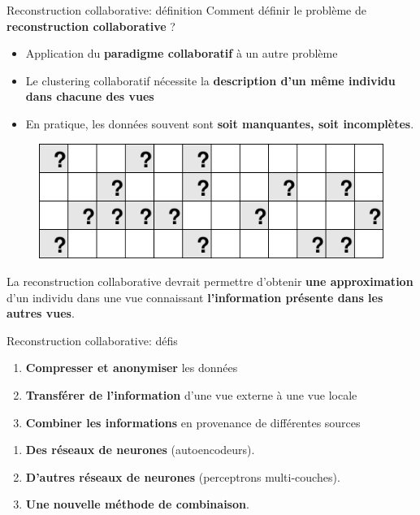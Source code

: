 \documentclass[hyperref={pdfpagelabels=false}]{beamer}
\begin{document}
    \begin{frame}{Reconstruction collaborative: définition}
        Comment définir le problème de \textbf{reconstruction collaborative} ?
        \begin{itemize}
            \item Application du \textbf{paradigme collaboratif} à un autre 
                problème
            \item Le clustering collaboratif nécessite la \textbf{description 
                d'un même individu dans chacune des vues}
            \item En pratique, les données souvent sont \textbf{soit manquantes, 
                soit incomplètes}.
        \end{itemize}
        \begin{figure}[h]
            \centering
            \includegraphics[scale=.15]{missing}
        \end{figure}

        La reconstruction collaborative devrait permettre d'obtenir \textbf{une 
        approximation} d'un individu dans une vue connaissant 
        \textbf{l'information présente dans les autres vues}.
    \end{frame}

    \begin{frame}{Reconstruction collaborative: défis}
        \begin{enumerate}
            \item \textbf{Compresser et anonymiser} les données
            \item \textbf{Transférer de l'information} d'une vue externe à une 
                vue locale
            \item \textbf{Combiner les informations} en provenance de 
                différentes sources
        \end{enumerate}

        \begin{enumerate}[<+(1)->]
            \item \textbf{Des réseaux de neurones} (autoencodeurs).
            \item \textbf{D'autres réseaux de neurones} (perceptrons 
                multi-couches).
            \item \textbf{Une nouvelle méthode de combinaison}.
        \end{enumerate}
    \end{frame}
\end{document}
